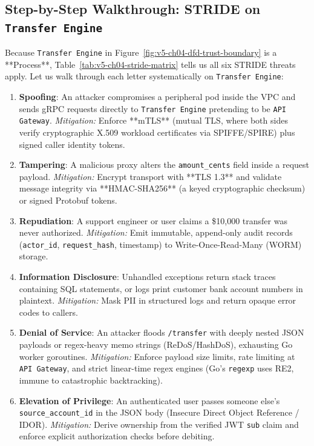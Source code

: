 \subsection{Step-by-Step Walkthrough: STRIDE on \texttt{Transfer Engine}}

Because \texttt{Transfer Engine} in Figure~\ref{fig:v5-ch04-dfd-trust-boundary} is a **Process**, Table~\ref{tab:v5-ch04-stride-matrix} tells us all six STRIDE threats apply. Let us walk through each letter systematically on \texttt{Transfer Engine}:
\begin{enumerate}[leftmargin=18pt]
  \item \textbf{Spoofing}: An attacker compromises a peripheral pod inside the VPC and sends gRPC requests directly to \texttt{Transfer Engine} pretending to be \texttt{API Gateway}. \emph{Mitigation:} Enforce **mTLS** (mutual TLS, where both sides verify cryptographic X.509 workload certificates via SPIFFE/SPIRE) plus signed caller identity tokens.
  \item \textbf{Tampering}: A malicious proxy alters the \texttt{amount\_cents} field inside a request payload. \emph{Mitigation:} Encrypt transport with **TLS 1.3** and validate message integrity via **HMAC-SHA256** (a keyed cryptographic checksum) or signed Protobuf tokens.
  \item \textbf{Repudiation}: A support engineer or user claims a \$10,000 transfer was never authorized. \emph{Mitigation:} Emit immutable, append-only audit records (\texttt{actor\_id}, \texttt{request\_hash}, timestamp) to Write-Once-Read-Many (WORM) storage.
  \item \textbf{Information Disclosure}: Unhandled exceptions return stack traces containing SQL statements, or logs print customer bank account numbers in plaintext. \emph{Mitigation:} Mask PII in structured logs and return opaque error codes to callers.
  \item \textbf{Denial of Service}: An attacker floods \texttt{/transfer} with deeply nested JSON payloads or regex-heavy memo strings (ReDoS/HashDoS), exhausting Go worker goroutines. \emph{Mitigation:} Enforce payload size limits, rate limiting at \texttt{API Gateway}, and strict linear-time regex engines (Go's \texttt{regexp} uses RE2, immune to catastrophic backtracking).
  \item \textbf{Elevation of Privilege}: An authenticated user passes someone else's \texttt{source\_account\_id} in the JSON body (Insecure Direct Object Reference / IDOR). \emph{Mitigation:} Derive ownership from the verified JWT \texttt{sub} claim and enforce explicit authorization checks before debiting.
\end{enumerate}

